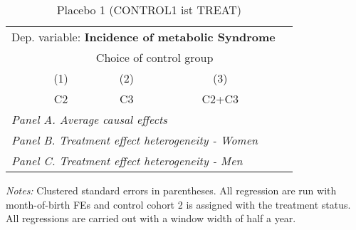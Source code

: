  \begin{table}[H] \centering \begin{threeparttable} \caption{Placebo 1 (CONTROL1 ist TREAT) } {\def\sym#1{\ifmmode^{#1}\else\(^{#1}\)\fi} \begin{tabular}{l*{4}{c}} \toprule \multicolumn{4}{l}{Dep. variable: \textbf{Incidence of metabolic Syndrome}} \\ & \multicolumn{3}{c}{Choice of control group} \\ \cmidrule(lr){2-4}
            &\multicolumn{1}{c}{(1)}&\multicolumn{1}{c}{(2)}&\multicolumn{1}{c}{(3)}\\
            &\multicolumn{1}{c}{C2}&\multicolumn{1}{c}{C3}&\multicolumn{1}{c}{C2+C3}\\
\midrule
 \multicolumn{4}{l}{\emph{Panel A. Average causal effects}} \\      \midrule\multicolumn{4}{l}{\emph{Panel B. Treatment effect heterogeneity - Women}} \\      \midrule\multicolumn{4}{l}{\emph{Panel C. Treatment effect heterogeneity - Men}} \\      
\bottomrule \end{tabular} } \begin{tablenotes} \item \scriptsize \emph{Notes:} Clustered standard errors in parentheses. All regression are run with month-of-birth FEs and control cohort 2 is assigned with the treatment status. All regressions are carried out with a window width of half a year. \end{tablenotes} \end{threeparttable} \end{table} 
